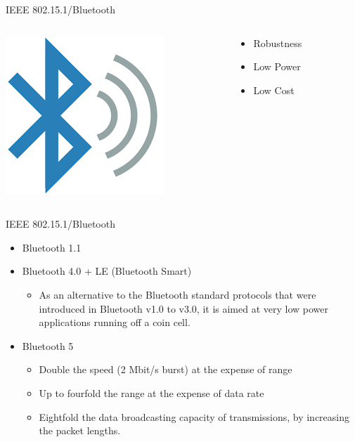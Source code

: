 \documentclass[serif,Blue]{beamer}
\begin{document}
\begin{frame}{IEEE 802.15.1/Bluetooth}
	\begin{columns}
		\begin{column}{0.5\textwidth}
			\begin{center}
				\includegraphics[scale=0.4]{img/ble.png}
			\end{center}
		\end{column}
		\begin{column}{0.5\textwidth}
			\begin{itemize}
				\item Robustness
				\item Low Power
				\item Low Cost
			\end{itemize}
		\end{column}
	\end{columns}
\end{frame}

\begin{frame}{IEEE 802.15.1/Bluetooth}
	\begin{itemize}
		\item Bluetooth 1.1
		\item Bluetooth 4.0 + LE (Bluetooth Smart)
			\begin{itemize}
				\item As an alternative to the Bluetooth standard protocols that were introduced in Bluetooth v1.0 to v3.0, it is aimed at very low power applications running off a coin cell.
			\end{itemize}
		\item Bluetooth 5
			\begin{itemize}
				\item Double the speed (2 Mbit/s burst) at the expense of range
				\item Up to fourfold the range at the expense of data rate
				\item Eightfold the data broadcasting capacity of transmissions, by increasing the packet lengths.
			\end{itemize}
	\end{itemize}
\end{frame}
\end{document}
